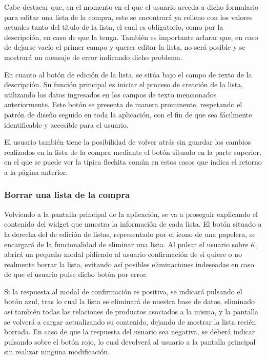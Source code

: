 \documentclass{article}
\begin{document}
Cabe destacar que, en el momento en el que el usuario acceda a dicho formulario para editar una lista de la compra, este se encontrará ya relleno con los valores actuales tanto del título de la lista, el cual es obligatorio, como por la descripción, en caso de que la tenga. También es importante aclarar que, en caso de dejarse vacío el primer campo y querer editar la lista, no será posible y se mostrará un mensaje de error indicando dicho problema.

En cuanto al botón de edición de la lista, se sitúa bajo el campo de texto de la descripción. Su función principal es iniciar el proceso de creación de la lista, utilizando los datos ingresados en los campos de texto mencionados anteriormente. Este botón se presenta de manera prominente, respetando el patrón de diseño seguido en toda la aplicación, con el fin de que sea fácilmente identificable y accesible para el usuario.

El usuario también tiene la posibilidad de volver atrás sin guardar los cambios realizados en la lista de la compra mediante el botón situado en la parte superior, en el que se puede ver la típica flechita común en estos casos que indica el retorno a la página anterior.

\subsubsection{Borrar una lista de la compra}

Volviendo a la pantalla principal de la aplicación, se va a proseguir explicando el contenido del widget que muestra la información de cada lista. El botón situado a la derecha del de edición de listas, representado por el icono de una papelera, se encargará de la funcionalidad de eliminar una lista. Al pulsar el usuario sobre él, abrirá un pequeño modal pidiendo al usuario confirmación de si quiere o no realmente borrar la lista, evitando así posibles eliminaciones indeseadas en caso de que el usuario pulse dicho botón por error.

Si la respuesta al modal de confirmación es positiva, se indicará pulsando el botón azul, tras lo cual la lista se eliminará de nuestra base de datos, eliminado así también todas las relaciones de productos asociados a la misma, y la pantalla se volverá a cargar actualizando su contenido, dejando de mostrar la lista recién borrada. En caso de que la respuesta del usuario sea negativa, se deberá indicar pulsando sobre el botón rojo, lo cual devolverá al usuario a la pantalla principal sin realizar ninguna modificación.
\end{document}

